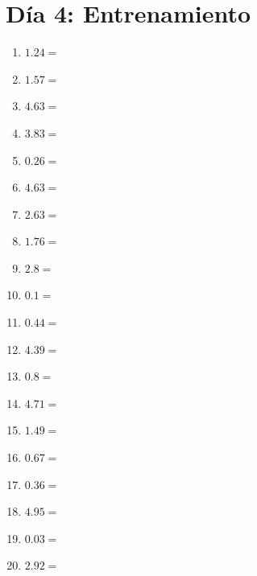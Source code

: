 \documentclass[12pt]{article}
\begin{document}
\section*{Día 4: Entrenamiento}
\begin{enumerate}
\item \large $ 1.24 = $ \vspace{1.5cm}
\item \large $ 1.57 = $ \vspace{1.5cm}
\item \large $ 4.63 = $ \vspace{1.5cm}
\item \large $ 3.83 = $ \vspace{1.5cm}
\item \large $ 0.26 = $ \vspace{1.5cm}
\item \large $ 4.63 = $ \vspace{1.5cm}
\item \large $ 2.63 = $ \vspace{1.5cm}
\item \large $ 1.76 = $ \vspace{1.5cm}
\item \large $ 2.8 = $ \vspace{1.5cm}
\item \large $ 0.1 = $ \vspace{1.5cm}
\newpage
\item \large $ 0.44 = $ \vspace{1.5cm}
\item \large $ 4.39 = $ \vspace{1.5cm}
\item \large $ 0.8 = $ \vspace{1.5cm}
\item \large $ 4.71 = $ \vspace{1.5cm}
\item \large $ 1.49 = $ \vspace{1.5cm}
\item \large $ 0.67 = $ \vspace{1.5cm}
\item \large $ 0.36 = $ \vspace{1.5cm}
\item \large $ 4.95 = $ \vspace{1.5cm}
\item \large $ 0.03 = $ \vspace{1.5cm}
\item \large $ 2.92 = $ \vspace{1.5cm}

\end{enumerate}
\end{document}
